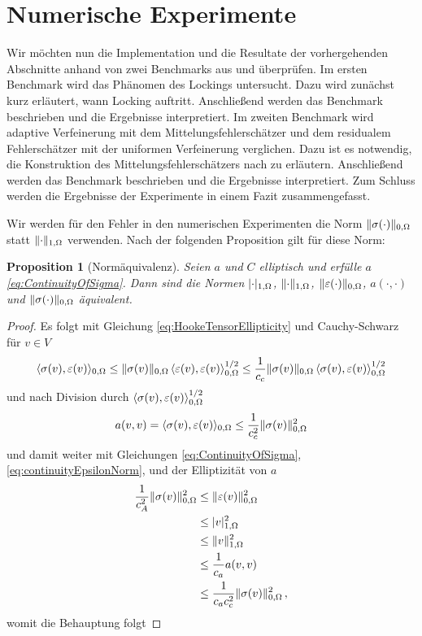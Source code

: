 \documentclass{scrartcl}
\newcounter{everything}
\newtheorem{proposition}[everything]{Proposition}
\def\e{\varepsilon}
\DeclarePairedDelimiter{\abs}{\lvert}{\rvert}
\DeclarePairedDelimiter{\inner}{\langle}{\rangle}
\DeclarePairedDelimiter{\norm}{\lVert}{\rVert}
\begin{document}
\newpage 
\section{Numerische Experimente}
Wir möchten nun die Implementation und die Resultate der vorhergehenden Abschnitte anhand von zwei Benchmarks aus  \cite[Abschnitt 3]{Car-2011} und \cite[S.255f.]{Alb-2002} überprüfen. 
Im ersten Benchmark wird das Phänomen des Lockings untersucht. Dazu wird zunächst kurz erläutert, wann Locking auftritt. Anschließend werden das Benchmark beschrieben und die Ergebnisse interpretiert.
Im zweiten Benchmark wird adaptive Verfeinerung mit dem Mittelungsfehlerschätzer und dem residualem Fehlerschätzer mit der uniformen Verfeiner\-ung verglichen. Dazu ist es notwendig, die Konstruktion des Mittelungsfehlerschätzers nach \cite[S.253f.]{Alb-2002} zu erläutern.
Anschließend werden das Benchmark beschrieben und die Ergebnisse interpretiert.
Zum Schluss werden die Ergebnisse der Experimente in einem Fazit zusammengefasst.

Wir werden für den Fehler in den numerischen Experimenten die Norm $\norm{\sigma(\cdot)}_{0,\Omega}$ statt $\norm{\cdot}_{1,\Omega}$ verwenden. Nach der folgenden Proposition gilt für diese Norm:
\begin{proposition}[Normäquivalenz]
Seien $a$ und $C$ elliptisch und erfülle $a$ \eqref{eq:ContinuityOfSigma}. Dann sind die Normen $\abs{\cdot}_{1,\Omega}$, $\norm{\cdot}_{1,\Omega}$, $\norm{\e(\cdot)}_{0,\Omega}$, $a(\cdot,\cdot)$ und $\norm{\sigma(\cdot)}_{0,\Omega}$ äquivalent.
\end{proposition}
\begin{proof}
	Es folgt mit Gleichung \eqref{eq:HookeTensorEllipticity} und Cauchy-Schwarz für $v\in V$
	\begin{align*}
		\inner{\sigma(v),\e(v)}_{0,\Omega}
		\leq\norm{\sigma(v)}_{0,\Omega}\,\inner{\e(v),\e(v)}_{0,\Omega}^{1/2}
		\leq\frac{1}{c_c}\norm{\sigma(v)}_{0,\Omega}\,\inner{\sigma(v),\e(v)}_{0,\Omega}^{1/2}
	\end{align*}
	und nach Division durch $\inner{\sigma(v),\e(v)}_{0,\Omega}^{1/2}$
	\begin{align*}
		a(v,v) = \inner{\sigma(v),\e(v)}_{0,\Omega}
		\leq \frac{1}{c_c^2}\norm{\sigma(v)}_{0,\Omega}^2
	\end{align*}
	und damit weiter mit Gleichungen  \eqref{eq:ContinuityOfSigma}, \eqref{eq:continuityEpsilonNorm}, und der Elliptizität von $a$ 
	\begin{align*}
		\frac{1}{c_A^2}\norm{\sigma(v)}_{0,\Omega}^2
		&\leq\norm{\e(v)}_{0,\Omega}^2 \\
		&\leq\abs{v}_{1,\Omega}^2 \\
		&\leq\norm{v}_{1,\Omega}^2 \\
		&\leq \frac{1}{c_a}a(v,v) \\
		&\leq\frac{1}{c_ac_c^2}\norm{\sigma(v)}_{0,\Omega}^2 \,,
	\end{align*}
	womit die Behauptung folgt
\end{proof}
\end{document}
